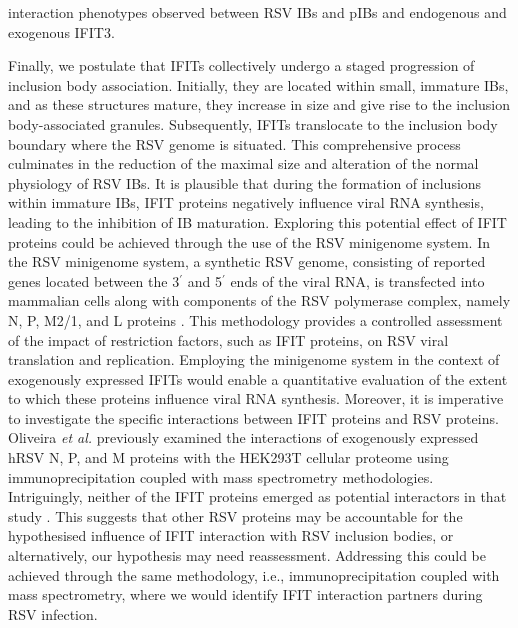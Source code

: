 interaction phenotypes observed between RSV IBs and pIBs and endogenous and exogenous IFIT3.

Finally, we postulate that IFITs collectively undergo a staged progression of inclusion body association. Initially, they are located within small, immature IBs, and as these structures mature, they increase in size and give rise to the inclusion body-associated granules. Subsequently, IFITs translocate to the inclusion body boundary where the RSV genome is situated. This comprehensive process culminates in the reduction of the maximal size and alteration of the normal physiology of RSV IBs. It is plausible that during the formation of inclusions within immature IBs, IFIT proteins negatively influence viral RNA synthesis, leading to the inhibition of IB maturation. Exploring this potential effect of IFIT proteins could be achieved through the use of the RSV minigenome system. In the RSV minigenome system, a synthetic RSV genome, consisting of reported genes located between the 3$^{\prime}$ and 5$^{\prime}$ ends of the viral RNA, is transfected into mammalian cells along with components of the RSV polymerase complex, namely N, P, M2/1, and L proteins \cite{Teng2016UseTranscription}. This methodology provides a controlled assessment of the impact of restriction factors, such as IFIT proteins, on RSV viral translation and replication. Employing the minigenome system in the context of exogenously expressed IFITs would enable a quantitative evaluation of the extent to which these proteins influence viral RNA synthesis. Moreover, it is imperative to investigate the specific interactions between IFIT proteins and RSV proteins. Oliveira \textit{et al.} previously examined the interactions of exogenously expressed hRSV N, P, and M proteins with the HEK293T cellular proteome using immunoprecipitation coupled with mass spectrometry methodologies. Intriguingly, neither of the IFIT proteins emerged as potential interactors in that study \cite{Oliveira2013HumanCells}. This suggests that other RSV proteins may be accountable for the hypothesised influence of IFIT interaction with RSV inclusion bodies, or alternatively, our hypothesis may need reassessment. Addressing this could be achieved through the same methodology, i.e., immunoprecipitation coupled with mass spectrometry, where we would identify IFIT interaction partners during RSV infection.

